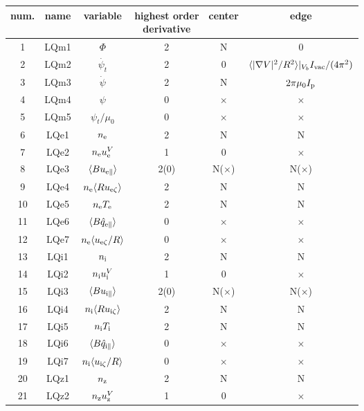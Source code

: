 \documentclass[11pt]{article}
\def\r#1{{\rm#1}}
\def\aves#1{\langle#1\rangle}
\def\para{\parallel}
\def\psid{\dot{\psi}}
\def\psit{\psi_t}
\def\psitd{\dot{\psit}}
\def\nee{n_\r{e}}
\def\ni{n_\r{i}}
\def\nz{n_\r{z}}
\def\Te{T_\r{e}}
\def\Ti{T_\r{i}}
\def\uzt#1{u_{\r{#1}\zeta}}
\def\upara#1{u_{\r{#1}\para}}
\def\qhatpara#1{\hat{q}_{\r{#1}\para}}
\def\uV#1{u_\r{#1}^V}
\begin{document}
%
\begin{tabular}{|c|c|c|c|c|c|}\hline
 num. & name & variable             & \shortstack{highest order\\ derivative} & center & edge \\\hline
 1    & LQm1 & $\Phi$               & 2    &  N           & 0\\
 2    & LQm2 & $\psitd$             & 2    &  0           & $\aves{|\nabla V|^2/R^2}|_{V_b}I_\r{vac}/(4\pi^2)$\\
 3    & LQm3 & $\psid$              & 2    &  N           & $2\pi\mu_0I_\r{p}$\\
 4    & LQm4 & $\psi$               & 0    &  $\times$    & $\times$\\
 5    & LQm5 & $\psit/\mu_0$        & 0    &  $\times$    & $\times$\\
 6    & LQe1 & $\nee$               & 2    &  N           & N\\
 7    & LQe2 & $\nee\uV{e}$           & 1    &  0           & $\times$\\
 8    & LQe3 & $\aves{B\upara{e}}$    & 2(0) &  N($\times$) & N($\times$)\\
 9    & LQe4 & $\nee\aves{R\uzt{e}}$  & 2    &  N           & N\\
 10   & LQe5 & $\nee \Te$           & 2    &  N           & N\\
 11   & LQe6 & $\aves{B\qhatpara{e}}$ & 0    &  $\times$    & $\times$\\
 12   & LQe7 & $\nee\aves{\uzt{e}/R}$ & 0    &  $\times$    & $\times$\\
 13   & LQi1 & $\ni$                & 2    &  N           & N\\
 14   & LQi2 & $\ni\uV{i}$            & 1    &  0           & $\times$\\
 15   & LQi3 & $\aves{B\upara{i}}$    & 2(0) &  N($\times$) & N($\times$)\\
 16   & LQi4 & $\ni\aves{R\uzt{i}}$   & 2    &  N           & N\\
 17   & LQi5 & $\ni \Ti$            & 2    &  N           & N\\
 18   & LQi6 & $\aves{B\qhatpara{i}}$ & 0    &  $\times$    & $\times$\\
 19   & LQi7 & $\ni\aves{\uzt{i}/R}$  & 0    &  $\times$    & $\times$\\
 20   & LQz1 & $\nz$                & 2    &  N           & N\\
 21   & LQz2 & $\nz\uV{z}$            & 1    &  0           & $\times$\\

\end{tabular}
\end{document}
